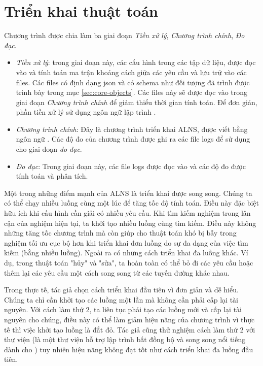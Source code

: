 \section{Triển khai thuật toán}
Chương trình được chia làm ba giai đoạn \textit{Tiền xử lý}, \textit{Chương trình chính}, \textit{Đo đạc}.
\begin{itemize}
  \item \textit{Tiền xử lý}: trong giai đoạn này, các cấu hình trong các tập dữ liệu, được đọc vào và tính toán ma trận khoảng cách giữa các yêu cầu và lưu trữ vào các files. Các files có định dạng json và có schema như đối tượng  đã trình được trình bày trong mục \ref{sec:core-objects}. Các files này sẽ được đọc vào trong giai đoạn \textit{Chương trình chính} để giảm thiểu thời gian tính toán. Để đơn giản, phần tiền xử lý sử dụng ngôn ngữ lập trình .
  \item \textit{Chương trình chính}: Đây là chương trình triển khai ALNS, được viết bằng ngôn ngữ . Các độ đo của chương trình được ghi ra các file logs để sử dụng cho giai đoạn \textit{đo đạc}.
  \item \textit{Đo đạc}: Trong giai đoạn này, các file logs được đọc vào và các độ đo được tính toán và phân tích.
\end{itemize}

Một trong những điểm mạnh của ALNS là triển khai được song song. Chúng ta có thể chạy nhiều luồng cùng một lúc để tăng tốc độ tính toán. Điều này đặc biệt hữu ích khi cấu hình cần giải có nhiều yêu cầu. Khi tìm kiếm nghiệm trong lân cận của nghiệm hiện tại, ta khởi tạo nhiều luồng cùng tìm kiếm. Điều này không những tăng tốc chương trình mà còn giúp cho thuật toán khó bị bẫy trong nghiệm tối ưu cục bộ hơn khi triển khai đơn luồng do sự đa dạng của việc tìm kiếm (bằng nhiều luồng). Ngoài ra có những cách triển khai đa luồng khác. Ví dụ, trong thuật toán "hủy" và "sửa", ta hoàn toàn có thể bỏ đi các yêu cầu hoặc thêm lại các yêu cầu một cách song song từ các tuyến đường khác nhau. 

Trong thực tế, tác giả chọn cách triển khai đầu tiên vì đơn giản và dễ hiểu. Chúng ta chỉ cần khởi tạo các luồng một lần mà không cần phải cấp lại tài nguyên. Với cách làm thứ 2, ta liên tục phải tạo các luồng mới và cấp lại tài nguyên cho chúng, điều này có thể làm giảm hiệu năng của chương trình vì thực tế thì việc khởi tạo luồng là đắt đỏ. Tác giả cũng thử nghiệm cách làm thứ 2 với thư viện  (là một thư viện hỗ trợ lập trình bất đồng bộ và song song nổi tiếng dành cho ) tuy nhiên hiệu năng không đạt tốt như cách triển khai đa luồng đầu tiên. 